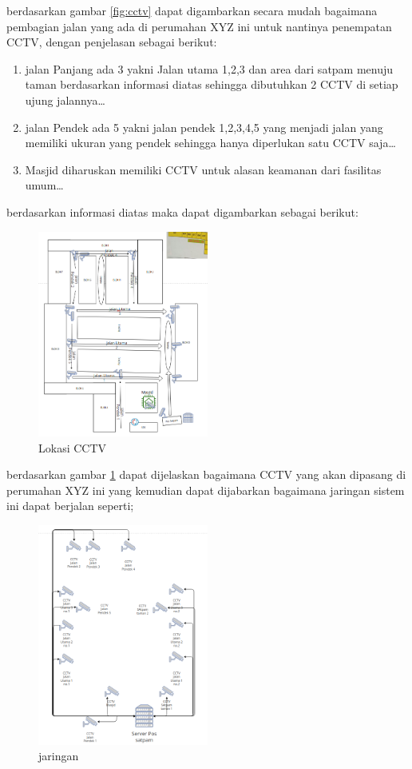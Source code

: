 \documentclass[a4paper, 12pt]{article}
\begin{document}
berdasarkan gambar \ref{fig:cctv} dapat digambarkan secara mudah bagaimana pembagian jalan yang ada di perumahan XYZ ini untuk nantinya penempatan CCTV, dengan penjelasan sebagai berikut:
\begin{enumerate}
  \item jalan Panjang ada 3 yakni Jalan utama 1,2,3 dan area dari satpam menuju taman berdasarkan informasi diatas sehingga dibutuhkan 2 CCTV di setiap ujung jalannya\dots
  \item jalan Pendek ada 5 yakni jalan pendek 1,2,3,4,5 yang menjadi jalan yang memiliki ukuran yang pendek sehingga hanya diperlukan satu CCTV saja\dots
  \item Masjid diharuskan memiliki CCTV untuk alasan keamanan dari fasilitas umum\dots
\end{enumerate}
berdasarkan informasi diatas maka dapat digambarkan sebagai berikut:
\begin{figure}[H]
  \begin{center}
    \includegraphics[width=0.5\textwidth]{images/jalan.png}
  \end{center}
  \caption{Lokasi CCTV}\label{fig:jalan}
\end{figure}
berdasarkan gambar \ref{fig:jalan} dapat dijelaskan bagaimana CCTV yang akan dipasang di perumahan XYZ ini yang kemudian dapat dijabarkan bagaimana jaringan sistem ini dapat berjalan seperti;
\begin{figure}[H]
  \begin{center}
    \includegraphics[width=0.5\textwidth]{images/sistem.png}
  \end{center}
  \caption{jaringan}\label{fig:jaringan}
\end{figure}
\end{document}
